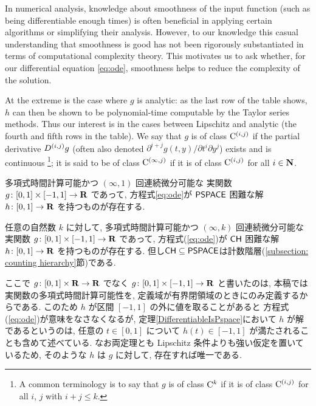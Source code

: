 In numerical analysis, 
knowledge about smoothness of the input function 
(such as being differentiable enough times) 
is often beneficial 
in applying certain algorithms or simplifying their analysis.
However, to our knowledge
this casual understanding that smoothness is good 
has not been 
rigorously substantiated in terms of 
computational complexity theory. 
This motivates us to ask whether, 
for our differential equation \eqref{eq:ode}, 
smoothness helps to reduce the complexity of the solution. 

At the extreme is the case where $g$ is analytic: 
as the last row of the table shows, 
$h$ can then be shown to be polynomial-time computable 
by the Taylor series methods. 
Thus our interest is in 
the cases between Lipschitz and analytic 
(the fourth and fifth rows in the table). 
We say that $g$ is of class $\mathrm C ^{(i, j)}$
if the partial derivative $D ^{(i, j)} g$ 
(often also denoted $\partial ^{i + j} g (t, y) / \partial t ^i \partial y ^j$)
exists and is continuous%
\footnote{%
A common terminology is to say that $g$ is of class $\mathrm C ^k$
if it is of class $\mathrm C ^{(i,j)}$ 
for all $i$, $j$ with $i + j \leq k$.}; 
it is said to be of class $\mathrm C ^{(\infty, j)}$ if
it is of class $\mathrm C ^{(i, j)}$ for all $i \in \mathbf N$. 

 \begin{theorem}
  \label{DifferentiableIsPspace}
  多項式時間計算可能かつ $(\infty, 1)$ 回連続微分可能な
  実関数 $g \colon [0,1] \times [-1,1] \to \mathbf R$ であって, 
  方程式\eqref{eq:ode}が
  $\mathsf{PSPACE}$ 困難な解 $h \colon [0, 1] \to \mathbf R$ を持つものが存在する.
 \end{theorem}

 \begin{theorem}
  \label{KTimesIsCH}
  任意の自然数 $k$ に対して, 
  多項式時間計算可能かつ $(\infty, k)$ 回連続微分可能な
  実関数 $g \colon [0,1] \times [-1,1] \to \mathbf R$ であって, 
  方程式(\ref{eq:ode})が
  $\mathsf{CH}$ 困難な解 $h \colon [0, 1] \to \mathbf R$ を持つものが存在する.
但し$\mathsf{CH} \subseteq \mathsf{PSPACE}$は計数階層(\ref{subsection: counting hierarchy}節)である.
 \end{theorem}

ここで $g \colon [0,1] \times \mathbf R \to \mathbf R$ でなく
$g \colon [0,1] \times [-1, 1] \to \mathbf R$ と書いたのは, 
本稿では実関数の多項式時間計算可能性を, 
定義域が有界閉領域のときにのみ定義するからである. 
このため $h$ が区間 $[-1, 1]$ の外に値を取ることがあると
方程式(\ref{eq:ode})が意味をなさなくなるが, 
定理\ref{DifferentiableIsPspace}において $h$ が解であるというのは, 
任意の $t \in [0, 1]$ について $h (t) \in [-1, 1]$ が満たされることも含めて述べている.
なお両定理とも Lipschitz 条件よりも強い仮定を置いているため, 
そのような $h$ は $g$ に対して, 存在すれば唯一である. 

